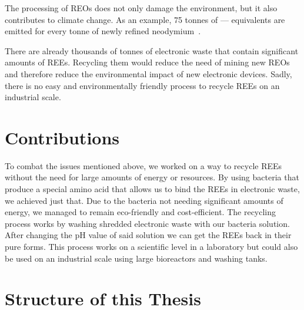 The processing of REOs does not only damage the environment, but it also contributes to climate change.
As an example, 75 tonnes of — equivalents are emitted for every tonne of newly refined neodymium~\cite{reeclimate}.

There are already thousands of tonnes of electronic waste that contain significant amounts of REEs. Recycling them would reduce the need of mining new REOs and therefore reduce the environmental impact of new electronic devices.
Sadly, there is no easy and environmentally friendly process to recycle REEs on an industrial scale.


\section{Contributions\authorB{}}
To combat the issues mentioned above, we worked on a way to recycle REEs without the
need for large amounts of energy or resources.
By using bacteria that produce a special amino acid that allows us to bind the REEs in electronic waste, we achieved just that.
Due to the bacteria not needing significant amounts of energy, we managed to remain eco-friendly and cost-efficient.
The recycling process works by washing shredded electronic waste with our bacteria solution.
After changing the pH value of said solution we can get
the REEs back in their pure forms.
This process works on a scientific level in a laboratory but could also be used on an industrial scale using large bioreactors and washing tanks.


\section{Structure of this Thesis\authorB{}}


